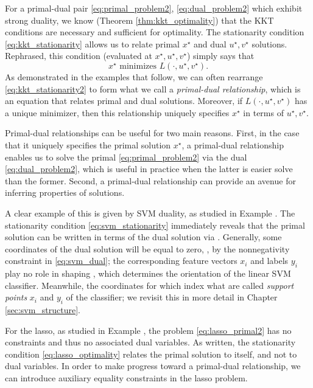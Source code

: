For a primal-dual pair \eqref{eq:primal_problem2}, \eqref{eq:dual_problem2}
which exhibit strong duality, we know (Theorem \ref{thm:kkt_optimality}) that
the KKT conditions are necessary and sufficient for optimality. The stationarity
condition \eqref{eq:kkt_stationarity} allows us to relate primal $x^\star$ and
dual $u^\star, v^\star$ solutions. Rephrased, this condition (evaluated at
$x^\star,  u^\star, v^\star$) simply says that
\begin{equation}
\label{eq:kkt_stationarity2}
\text{$x^\star$ minimizes $L(\cdot, u^\star, v^\star)$}.
\end{equation}
As demonstrated in the examples that follow, we can often rearrange
\eqref{eq:kkt_stationarity2} to form what we call a \emph{primal-dual
  relationship}, which is an equation that relates primal and dual solutions.
Moreover, if $L(\cdot, u^\star, v^\star)$ has a unique minimizer, then this
relationship uniquely specifies $x^\star$ in terms of $u^\star, v^\star$.     

Primal-dual relationships can be useful for two main reasons. First, in the case
that it uniquely specifies the primal solution $x^\star$, a primal-dual
relationship enables us to solve the primal \eqref{eq:primal_problem2} via the
dual \eqref{eq:dual_problem2}, which is useful in practice when the latter is
easier solve than the former. Second, a primal-dual relationship can provide an
avenue for inferring properties of solutions.

A clear example of this is given by SVM duality, as studied in Example
. The stationarity condition \eqref{eq:svm_stationarity}
immediately reveals that the primal solution \smash{$\hbeta$} can be written in
terms of the dual solution via . Generally, some coordinates of the dual solution will be equal to
zero, , by the nonnegativity constraint in
\eqref{eq:svm_dual}; the corresponding feature vectors $x_i$ and labels $y_i$
play no role in shaping \smash{$\hbeta$}, which determines the orientation of
the linear SVM classifier. Meanwhile, the coordinates for which
 index what are called \emph{support points} $x_i$
and $y_i$ of the classifier; we revisit this in more detail in Chapter
\ref{sec:svm_structure}.      

For the lasso, as studied in Example , the problem
\eqref{eq:lasso_primal2} has no constraints and thus no associated dual   
variables. As written, the stationarity condition \eqref{eq:lasso_optimality}
relates the primal solution to itself, and not to dual variables. In order to
make progress toward a primal-dual relationship, we can introduce auxiliary
equality constraints in the lasso problem.

